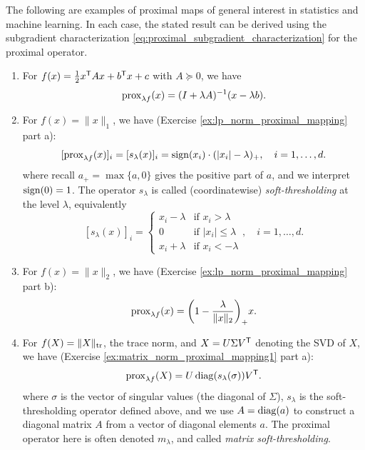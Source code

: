 \begin{Example}
\label{xa:proximal_mappings}
The following are examples of proximal maps of general interest in statistics
and machine learning. In each case, the stated result can be derived using the 
subgradient characterization \eqref{eq:proximal_subgradient_characterization} 
for the proximal operator.

\begin{enumerate}[label=\alph*., ref=\alph*]
\item For $f(x) = \frac{1}{2} x^{\mathsf{T}} A x + b^{\mathsf{T}} x + c$ with $A \succeq 0$, we have 
  \[
  \operatorname{prox}_{\lambda f}(x) = (I + \lambda A)^{-1} (x - \lambda b).
  \]

\item {} 
  For $f(x) = \|x\|_1$, we have (Exercise \ref{ex:lp_norm_proximal_mapping} part 
  a): 
  \[
  [\operatorname{prox}_{\lambda f}(x)]_i = [s_\lambda(x)]_i 
  = \operatorname{sign}(x_i) \cdot (|x_i| - \lambda)_+, \quad i = 1,\dots,d.  
  \]
  where recall $a_+ = \max\{a, 0\}$ gives the positive part of $a$, and we
  interpret $\operatorname{sign}(0) = 1$. The operator $s_\lambda$ is called (coordinatewise)
  \emph{soft-thresholding} at the level $\lambda$, equivalently   
  \begin{equation}
  \label{eq:soft_thresholding}
  [s_\lambda(x)]_i = 
  \begin{cases}
  x_i - \lambda & \text{if $x_i > \lambda$} \\
  0 & \text{if $|x_i| \leq \lambda$} \\
  x_i + \lambda & \text{if $x_i < -\lambda$}
  \end{cases},
  \quad i = 1,\dots,d.
  \end{equation}

\item {}  
  For $f(x) = \|x\|_2$, we have (Exercise \ref{ex:lp_norm_proximal_mapping} part
  b): 
  \[
  \operatorname{prox}_{\lambda f}(x) = \bigg(1 - \frac{\lambda}{\|x\|_2} \bigg)_+ x.
  \]

\item {} 
  For $f(X) = \|X\|_{\operatorname{tr}}$, the trace norm, and $X = U \Sigma V^{\mathsf{T}}$ denoting the
  SVD of $X$, we have (Exercise \ref{ex:matrix_norm_proximal_mapping1} part a):      
  \[
  \operatorname{prox}_{\lambda f}(X) = U \operatorname{diag}(s_\lambda(\sigma)) V^{\mathsf{T}}.
  \]
  where $\sigma$ is the vector of singular values (the diagonal of $\Sigma$),
  $s_\lambda$ is the soft-thresholding operator defined above, and we use $A =
  \operatorname{diag}(a)$ to construct a diagonal matrix $A$ from a vector of diagonal
  elements $a$. The proximal operator here is often denoted $m_\lambda$, and
  called \emph{matrix soft-thresholding}. 


\end{enumerate}
\end{Example}
